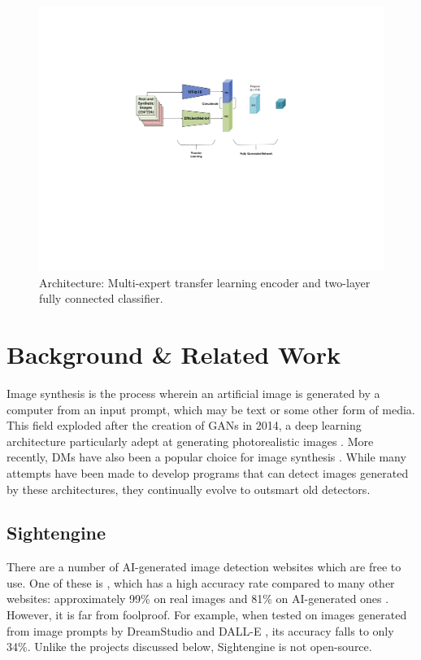 \documentclass{article} %
\begin{document}
\begin{figure}[h]
    \begin{center}
        \includegraphics[scale=0.5]{figs/EffiVit.pdf}
    \end{center}
    \caption{Architecture: Multi-expert transfer learning encoder and two-layer fully connected classifier.}
    \label{fig:EffViT_Architecture}
\end{figure}

\section{Background \& Related Work}
\label{background}

Image synthesis is the process wherein an artificial image is generated by a computer from an input prompt, which may be text or some other form of media. This field exploded after the creation of GANs in 2014, a deep learning architecture particularly adept at generating photorealistic images \citep{GANfather}. More recently, DMs have also been a popular choice for image synthesis \citep{latent-diffusion}. While many attempts have been made to develop programs that can detect images generated by these architectures, they continually evolve to outsmart old detectors.

\subsection{Sightengine}

There are a number of AI-generated image detection websites which are free to use. One of these is \citet{sightengine}, which has a high accuracy rate compared to many other websites: approximately 99\% on real images and 81\% on AI-generated ones \citep{li2024adversarialaiartunderstandinggeneration}. However, it is far from foolproof. For example, when tested on images generated from image prompts by DreamStudio \citep{dreamstudio} and DALL-E \citep{dall-e}, its accuracy falls to only 34\%. Unlike the projects discussed below, Sightengine is not open-source.
\end{document}

